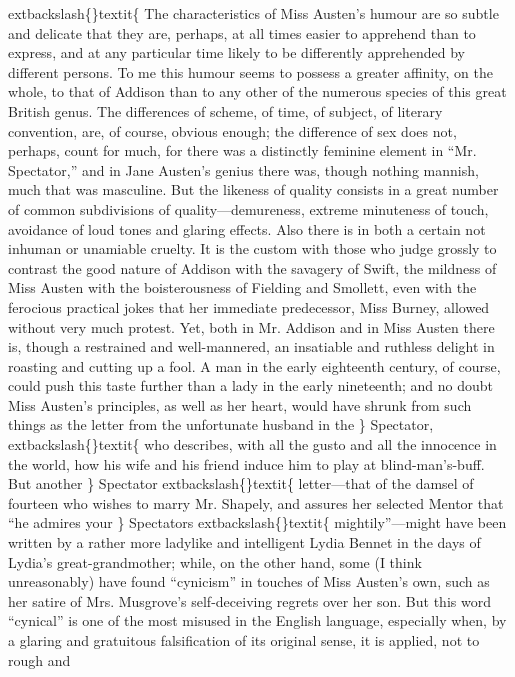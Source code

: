 \documentclass[10pt]{book}
\begin{document}
	extbackslash\{\}textit\{
    The characteristics of Miss Austen’s humour are so subtle and delicate
that they are, perhaps, at all times easier to apprehend than to
express, and at any particular
    time likely to be differently
apprehended by different persons. To me this humour seems to possess a
greater affinity, on the whole, to that of Addison than to any other of
the numerous species of this great British genus. The differences of
scheme, of time, of subject, of literary convention, are, of course,
obvious enough; the difference of sex does not, perhaps, count for much,
for there was a distinctly feminine element in “Mr. Spectator,” and in
Jane Austen’s genius there was, though nothing mannish, much that was
masculine. But the likeness of quality consists in a great number of
common subdivisions of quality—demureness, extreme minuteness of touch,
avoidance of loud tones and glaring effects. Also there is in both a
certain not inhuman or unamiable cruelty. It is the custom with those
who judge grossly to contrast the good nature of Addison with the
savagery of Swift, the mildness of Miss Austen with the boisterousness
of Fielding and Smollett, even with the ferocious practical jokes that
her immediate predecessor, Miss Burney, allowed without very much
protest. Yet, both in Mr. Addison and in Miss Austen there is, though a
restrained and well-mannered, an insatiable and ruthless delight in
roasting and cutting up a fool. A man in the early eighteenth century,
of course, could push this taste further than a lady in the early
nineteenth; and no doubt Miss Austen’s principles, as well as her heart,
would have shrunk from such things as the letter from the unfortunate
husband in the
   \}
   Spectator,
   	extbackslash\{\}textit\{
    who describes, with all the gusto and all the
innocence in the world, how his wife and his friend induce him to play
at blind-man’s-buff. But another
   \}
   Spectator
   	extbackslash\{\}textit\{
    letter—that of the damsel
of fourteen who
    wishes to marry Mr. Shapely, and assures her selected
Mentor that “he admires your
   \}
   Spectators
   	extbackslash\{\}textit\{
    mightily”—might have been
written by a rather more ladylike and intelligent Lydia Bennet in the
days of Lydia’s great-grandmother; while, on the other hand, some (I
think unreasonably) have found “cynicism” in touches of Miss Austen’s
own, such as her satire of Mrs. Musgrove’s self-deceiving regrets over
her son. But this word “cynical” is one of the most misused in the
English language, especially when, by a glaring and gratuitous
falsification of its original sense, it is applied, not to rough and
\end{document}
